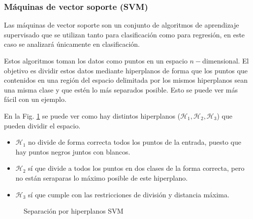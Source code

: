 \subsubsection{Máquinas de vector soporte (SVM)}

Las máquinas de vector soporte son un conjunto de algoritmos de aprendizaje supervisado que se utilizan tanto para clasificación como para regresión, en este caso se analizará únicamente en clasificación.

Estos algoritmos toman los datos como puntos en un espacio $n-$dimensional. El objetivo es dividir estos datos mediante hiperplanos de forma que los puntos que contenidos en una región del espacio delimitada por los mismos hiperplanos sean una misma clase y que estén lo más separados posible. Esto se puede ver más fácil con un ejemplo.

En la Fig. \ref{fig:svm_separation} se puede ver como hay distintos hiperplanos ($\mathcal{H}_1, \mathcal{H}_2, \mathcal{H}_3$) que pueden dividir el espacio. 

\begin{itemize}
    \item $\mathcal{H}_1$ no divide de forma correcta todos los puntos de la entrada, puesto que hay puntos negros juntos con blancos.
    \item $\mathcal{H}_2$ sí que divide a todos los puntos en dos clases de la forma correcta, pero no están seraparas lo máximo posible de este hiperplano.
    \item $\mathcal{H}_3$ sí que cumple con las restricciones de división y distancia máxima.
\end{itemize}

\begin{figure}[htpb!]
    \centering
    \caption{Separación por hiperplanos SVM \cite{svmseparation2012}}
    \label{fig:svm_separation}
\end{figure}

